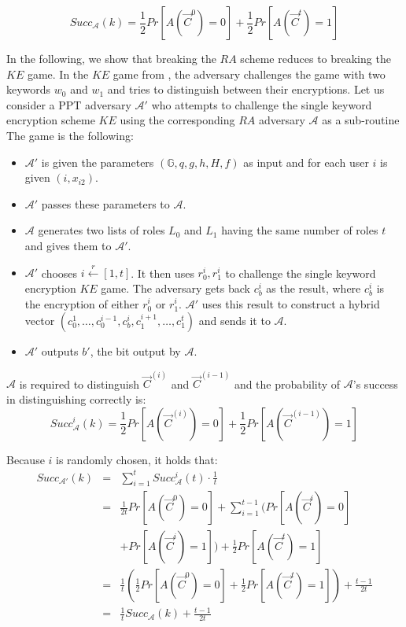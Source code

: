 \documentclass[final,5p,times,twocolumn]{elsarticle}
\begin{document}
\begin{equation}
Succ_{\mathcal{A}}(k) =\frac{1}{2}
Pr[A(\vec{C}^0) = 0] + \frac{1}{2}
Pr[A(\vec{C}^t) = 1]
\end{equation}

In the following, we show that breaking the $RA$ scheme reduces to breaking the $KE$ game. In the $KE$ game from \cite{Dong2011}, the adversary challenges the game with two keywords $w_0$ and $w_1$ and tries to distinguish between their encryptions. Let us consider a PPT adversary $\mathcal{A}'$ who attempts to challenge the single keyword encryption scheme $KE$ using the corresponding $RA$ adversary $\mathcal{A}$ as a sub-routine The game is the following:
\begin{itemize}
\item $\mathcal{A}'$ is given the parameters $(\mathbb{G},q,g,h,H,f)$ as input and for each user $i$ is given $(i,x_{i2})$.
\item $\mathcal{A}'$ passes these parameters to $\mathcal{A}$.
\item $\mathcal{A}$ generates two lists of roles $L_0$ and $L_1$ having the same number of roles  $t$ and gives them to $\mathcal{A}'$.
\item $\mathcal{A}'$ chooses $i \xleftarrow{r} [1, t]$. It then uses $r^i_0, r^i_1$ to challenge the single keyword encryption $KE$ game. The adversary gets back $c^i_b$ as the result, where $c^i_b$ is the encryption of either $r^i_0$ or $r^i_1$. $\mathcal{A}'$ uses this result to construct a hybrid vector $(c^1_0,\ldots, c^{i-1}_0, c_b^i, c_1^{i+1},\ldots,c^t_1)$ and sends it to $\mathcal{A}$.
\item $\mathcal{A}'$ outputs $b'$, the bit output by $\mathcal{A}$.
\end{itemize}

$\mathcal{A}$ is required to distinguish $\vec{C}^{(i)}$ and $\vec{C}^{(i-1)}$ and the probability of $\mathcal{A}$'s success in distinguishing correctly is:
\begin{equation}
Succ_{\mathcal{A}}^i(k) =\frac{1}{2}
Pr[A(\vec{C}^{(i)}) = 0] + \frac{1}{2}
Pr[A(\vec{C}^{(i-1)}) = 1]
\end{equation}

Because $i$ is randomly chosen, it holds that:
\noindent
\begin{equation}
\begin{array}{lll}
Succ_{\mathcal{A}'}(k) & = &\sum_{i=1}^tSucc_{\mathcal{A}}^i(t) \cdot \frac{1}{t} \\
& = &\frac{1}{2t}Pr[A(\vec{C}^0) = 0] + \sum_{i=1}^{t-1}(Pr[A(\vec{C}^i) = 0] \\
& & +Pr[A(\vec{C}^i) = 1]) + \frac{1}{2}Pr[A(\vec{C}^t) = 1] \\
& = & \frac{1}{t} (\frac{1}{2}Pr[A(\vec{C}^0) = 0] + \frac{1}{2}Pr[A(\vec{C}^t)=1]) + \frac{t-1}{2t} \\
& = & \frac{1}{t}Succ_{\mathcal{A}}(k)+ \frac{t-1}{2t}
\end{array}
\end{equation}
\end{document}
